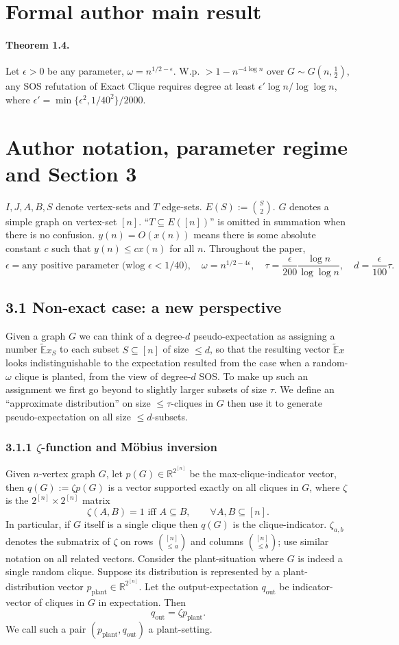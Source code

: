 \documentclass[10pt,a4paper]{article}
\begin{document}
\section*{Formal author main result}
\paragraph{Theorem 1.4.} Let $\epsilon>0$ be any parameter, $\omega=n^{1/2-\epsilon}$. W.p. $>1-n^{-4\log n}$ over $G\sim G(n,\frac12)$, any SOS refutation of Exact Clique requires degree at least $\epsilon'\log n/\log\log n$, where $\epsilon'=\min\{\epsilon^2,1/40^2\}/2000$.

\section*{Author notation, parameter regime and Section 3}
$I,J,A,B,S$ denote vertex-sets and $T$ edge-sets. $E(S):=\binom S2$. $G$ denotes a simple graph on vertex-set $[n]$. ``$T\subseteq E([n])$'' is omitted in summation when there is no confusion. $y(n)=O(x(n))$ means there is some absolute constant $c$ such that $y(n)\le cx(n)$ for all $n$.
Throughout the paper,
\[\epsilon=\text{any positive parameter (wlog }\epsilon<1/40),\quad\omega=n^{1/2-4\epsilon},\quad\tau=\frac\epsilon{200}\frac{\log n}{\log\log n},\quad d=\frac\epsilon{100}\tau.\]
\subsection*{3.1 Non-exact case: a new perspective}
Given a graph $G$ we can think of a degree-$d$ pseudo-expectation as assigning a number $\widetilde{\mathbb E}x_S$ to each subset $S\subseteq[n]$ of size $\le d$, so that the resulting vector $\widetilde{\mathbb E}x$ looks indistinguishable to the expectation resulted from the case when a random-$\omega$ clique is planted, from the view of degree-$d$ SOS. To make up such an assignment we first go beyond to slightly larger subsets of size $\tau$. We define an ``approximate distribution'' on size $\le\tau$-cliques in $G$ then use it to generate pseudo-expectation on all size $\le d$-subsets.
\subsubsection*{3.1.1 $\zeta$-function and M\"obius inversion}
Given $n$-vertex graph $G$, let $p(G)\in\mathbb R^{2^{[n]}}$ be the max-clique-indicator vector, then $q(G):=\zeta p(G)$ is a vector supported exactly on all cliques in $G$, where $\zeta$ is the $2^{[n]}\times2^{[n]}$ matrix
\[\zeta(A,B)=1\text{ iff }A\subseteq B,\qquad\forall A,B\subseteq[n].\tag{3.1}\]
In particular, if $G$ itself is a single clique then $q(G)$ is the clique-indicator. $\zeta_{a,b}$ denotes the submatrix of $\zeta$ on rows $\binom{[n]}{\le a}$ and columns $\binom{[n]}{\le b}$; use similar notation on all related vectors. Consider the plant-situation where $G$ is indeed a single random clique. Suppose its distribution is represented by a plant-distribution vector $p_{\mathrm{plant}}\in\mathbb R^{2^{[n]}}$. Let the output-expectation $q_{\mathrm{out}}$ be indicator-vector of cliques in $G$ in expectation. Then
\[q_{\mathrm{out}}=\zeta p_{\mathrm{plant}}.\tag{3.2}\]
We call such a pair $(p_{\mathrm{plant}},q_{\mathrm{out}})$ a plant-setting.
\end{document}
